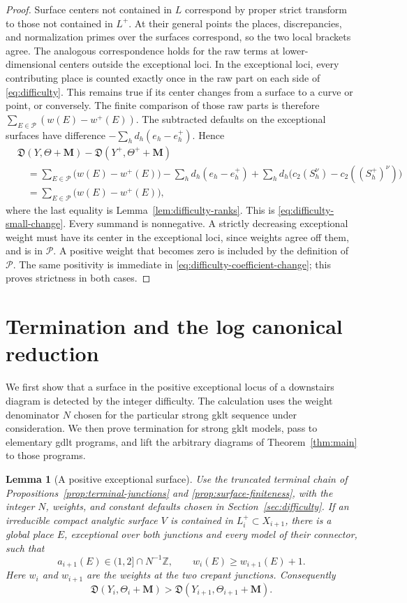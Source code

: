\documentclass[11pt]{amsart}
\newtheorem{lemma}[theorem]{Lemma}
\theoremstyle{definition}
\theoremstyle{remark}
\numberwithin{equation}{section}
\newcommand{\Z}{\mathbb{Z}}
\newcommand{\M}{\mathbf{M}}
\begin{document}
\begin{proof}
Surface centers not contained in \(L\) correspond by proper strict
transform to those not contained in \(L^+\).  At their general points the
places, discrepancies, and normalization primes over the surfaces
correspond, so the two local brackets agree.  The analogous correspondence
holds for the raw terms at lower-dimensional centers outside the exceptional
loci.  In the exceptional loci, every contributing place is counted exactly
once in the raw part on each side of \eqref{eq:difficulty}.  This remains
true if its center changes from a surface to a curve or point, or conversely.
The finite comparison of those raw parts is therefore
\(\sum_{E\in\mathcal P}(w(E)-w^+(E))\).  The subtracted defaults on the
exceptional surfaces have difference \(-\sum_h d_h(e_h-e_h^+)\).  Hence
\begin{align*}
 &\mathfrak D(Y,\Theta+\M)-\mathfrak D(Y^+,\Theta^++\M)\\
 &\quad=\sum_{E\in\mathcal P}\bigl(w(E)-w^+(E)\bigr)
       -\sum_h d_h(e_h-e_h^+)
       +\sum_h d_h\bigl(c_2(S_h^\nu)-c_2((S_h^+)^\nu)\bigr)\\
 &\quad=\sum_{E\in\mathcal P}\bigl(w(E)-w^+(E)\bigr),
\end{align*}
where the last equality is Lemma~\ref{lem:difficulty-ranks}.  This is
\eqref{eq:difficulty-small-change}.  Every summand is nonnegative.  A
strictly decreasing exceptional weight must have its center in the
exceptional loci, since weights agree off them, and is in \(\mathcal P\).
A positive weight that becomes zero is included by the definition of
\(\mathcal P\).  The same positivity is immediate in
\eqref{eq:difficulty-coefficient-change}; this proves strictness in both
cases.
\end{proof}

\section{Termination and the log canonical reduction}\label{sec:completion}

We first show that a surface in the positive exceptional locus of a
downstairs diagram is detected by the integer difficulty.  The calculation
uses the weight denominator \(N\) chosen for the particular strong gklt
sequence under consideration.  We then prove
termination for strong gklt models, pass to elementary gdlt programs, and
lift the arbitrary diagrams of Theorem~\ref{thm:main} to those programs.

\begin{lemma}[A positive exceptional surface]\label{lem:positive-surface}
Use the truncated terminal chain of
Propositions~\ref{prop:terminal-junctions} and
\ref{prop:surface-finiteness}, with the integer \(N\), weights, and constant
defaults chosen in Section~\ref{sec:difficulty}.  If an irreducible compact
analytic surface \(V\) is contained in \(L_i^+\subset X_{i+1}\), there is
a global place \(E\), exceptional over both junctions and every model of
their connector, such that
\[
 a_{i+1}(E)\in(1,2]\cap N^{-1}\Z,
 \qquad w_i(E)\geq w_{i+1}(E)+1.
\]
Here \(w_i\) and \(w_{i+1}\) are the weights at the two crepant junctions.
Consequently
\[
 \mathfrak D(Y_i,\Theta_i+\M)
 >\mathfrak D(Y_{i+1},\Theta_{i+1}+\M).
\]
\end{lemma}
\end{document}
